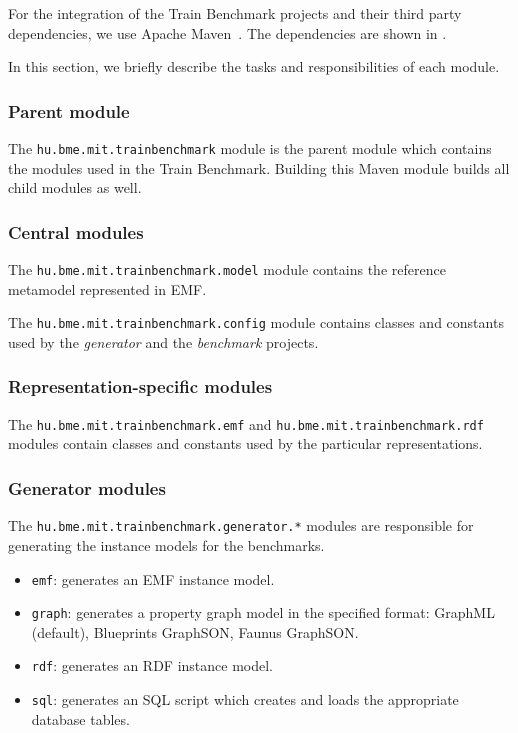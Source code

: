 For the integration of the Train Benchmark projects and their third party dependencies, we use Apache Maven~\cite{Maven}. The dependencies are shown in .

In this section, we briefly describe the tasks and responsibilities of each module.

\subsubsection{Parent module}

The \texttt{hu.bme.mit.trainbenchmark} module is the parent module which contains the modules used in the Train Benchmark. Building this Maven module builds all child modules as well.

\subsubsection{Central modules}

The \texttt{hu.bme.mit.trainbenchmark.model} module contains the reference metamodel represented in EMF.

The \texttt{hu.bme.mit.trainbenchmark.config} module contains classes and constants used by the \emph{generator} and the \emph{benchmark} projects.



\subsubsection{Representation-specific modules}

The \texttt{hu.bme.mit.trainbenchmark.emf} and \texttt{hu.bme.mit.trainbenchmark.rdf} modules contain classes and constants used by the particular representations.



\subsubsection{Generator modules}

The \texttt{hu.bme.mit.trainbenchmark.generator.*} modules are responsible for generating the instance models for the benchmarks.

\begin{itemize}
  \item \texttt{emf}: generates an EMF instance model.
  \item \texttt{graph}: generates a property graph model in the specified format: GraphML (default), Blueprints GraphSON, Faunus GraphSON.
  \item \texttt{rdf}: generates an RDF instance model.
  \item \texttt{sql}: generates an SQL script which creates and loads the appropriate database tables.
\end{itemize}



